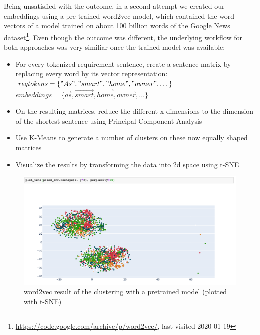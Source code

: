Being unsatisfied with the outcome, in a second attempt we created our embeddings using a pre-trained word2vec model, which contained the word vectors of a model trained on about 100 billion words of the Google News dataset\footnote{\url{https://code.google.com/archive/p/word2vec/}, last visited 2020-01-19}. Even though the outcome was different, the underlying workflow for both approaches was very similiar once the trained model was available:
\begin{itemize}
	\item For every tokenized requirement sentence, create a sentence matrix by replacing every word by its vector representation:\\
	$reqtokens = \{"As", "smart", "home", "owner", \dots\}$\\
	$embeddings = \{ \vec{as}, \vec{smart}, \vec{home}, \vec{owner}, \dots \}$
	\item On the resulting matrices, reduce the different x-dimensions to the dimension of the shortest sentence using Principal Component Analysis
	\item Use K-Means to generate a number of clusters on these now equally shaped matrices
	\item Visualize the results by transforming the data into 2d space using t-SNE\cite{maaten_visualizing_2008}
\end{itemize}


\begin{figure}[ht]
  \begin{center}
    \includegraphics[width=\textwidth]{screenshots/google_word_2_vec_tsne_opti4.png}
    \caption{word2vec result of the clustering with a pretrained model (plotted with t-SNE)}
    \label{fig:w2v-pretrained-4}
  \end{center}
\end{figure}
\FloatBarrier